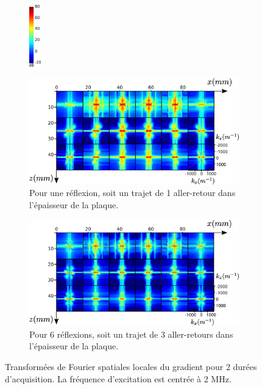 \begin{figure}[!h]
    \centering
    \begin{subfigure}[b]{0.05\textwidth}
 		\hspace{-2cm}\includegraphics[width=0.5cm]{img/echelle_fft.png}\vspace{2.1cm}
	\end{subfigure}
    \begin{subfigure}[b]{0.4\textwidth}
		\hspace{-3cm}\includegraphics[width=1.5\textwidth]{img/1400pt.png}
		\caption{Pour une réflexion, soit un trajet de 1 aller-retour dans l'épaisseur de la plaque.}
		\label{app:1400pt}
	\end{subfigure}	
	\hspace{0.7cm}
	\begin{subfigure}[b]{0.4\textwidth}
		\hspace{-0.7cm}\includegraphics[width=1.5\textwidth]{img/4200pt.png}
		\caption{Pour 6 réflexions, soit un trajet de 3 aller-retours dans l'épaisseur de la plaque.}
		\label{app:4200pt}
	\end{subfigure}
	\caption{Transformées de Fourier spatiales locales du gradient pour 2 durées d'acquisition. La fréquence d'excitation est centrée à 2 MHz.}
\end{figure}

